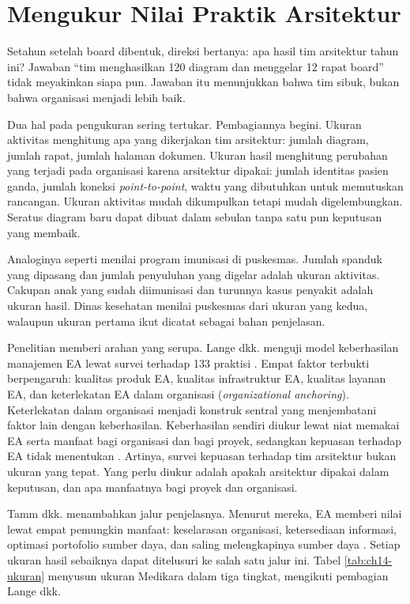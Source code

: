 \section{Mengukur Nilai Praktik Arsitektur}

Setahun setelah board dibentuk, direksi bertanya: apa hasil tim arsitektur
tahun ini? Jawaban ``tim menghasilkan 120 diagram dan menggelar 12 rapat
board'' tidak meyakinkan siapa pun. Jawaban itu menunjukkan bahwa tim
sibuk, bukan bahwa organisasi menjadi lebih baik.

Dua hal pada pengukuran sering tertukar. Pembagiannya begini. Ukuran
aktivitas menghitung apa yang dikerjakan tim arsitektur: jumlah diagram,
jumlah rapat, jumlah halaman dokumen. Ukuran hasil menghitung perubahan
yang terjadi pada organisasi karena arsitektur dipakai: jumlah identitas
pasien ganda, jumlah koneksi \textit{point-to-point}, waktu yang dibutuhkan
untuk memutuskan rancangan. Ukuran aktivitas mudah dikumpulkan tetapi mudah
digelembungkan. Seratus diagram baru dapat dibuat dalam sebulan tanpa satu
pun keputusan yang membaik.

Analoginya seperti menilai program imunisasi di puskesmas. Jumlah spanduk
yang dipasang dan jumlah penyuluhan yang digelar adalah ukuran aktivitas.
Cakupan anak yang sudah diimunisasi dan turunnya kasus penyakit adalah
ukuran hasil. Dinas kesehatan menilai puskesmas dari ukuran yang kedua,
walaupun ukuran pertama ikut dicatat sebagai bahan penjelasan.

Penelitian memberi arahan yang serupa. Lange dkk. menguji model
keberhasilan manajemen EA lewat survei terhadap 133 praktisi
\cite{lange2016}. Empat faktor terbukti berpengaruh: kualitas produk EA,
kualitas infrastruktur EA, kualitas layanan EA, dan keterlekatan EA dalam
organisasi (\textit{organizational anchoring}). Keterlekatan dalam
organisasi menjadi konstruk sentral yang menjembatani faktor lain dengan
keberhasilan. Keberhasilan sendiri diukur lewat niat memakai EA serta
manfaat bagi organisasi dan bagi proyek, sedangkan kepuasan terhadap EA
tidak menentukan \cite{lange2016}. Artinya, survei kepuasan terhadap tim
arsitektur bukan ukuran yang tepat. Yang perlu diukur adalah apakah
arsitektur dipakai dalam keputusan, dan apa manfaatnya bagi proyek dan
organisasi.

Tamm dkk. menambahkan jalur penjelasnya. Menurut mereka, EA memberi nilai
lewat empat pemungkin manfaat: keselarasan organisasi, ketersediaan
informasi, optimasi portofolio sumber daya, dan saling melengkapinya sumber
daya \cite{tamm2011}. Setiap ukuran hasil sebaiknya dapat ditelusuri ke
salah satu jalur ini. Tabel \ref{tab:ch14-ukuran} menyusun ukuran Medikara
dalam tiga tingkat, mengikuti pembagian Lange dkk.

